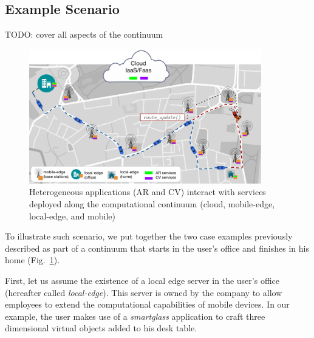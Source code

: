 

\subsection{Example Scenario}

TODO: cover all aspects of the continuum

\begin{figure}[tbp]
	\includegraphics[width=0.9\textwidth]{figs/Continuum-Scenario}
	\caption{Heterogeneous applications (AR and CV) interact with services deployed along the computational continuum (cloud, mobile-edge, local-edge, and mobile)}
	\label{fig:continuum-scenario}
\end{figure}


To illustrate such scenario, we put together the two case examples previously described as part of a continuum that starts in the user's office and finishes in his home (Fig.~\ref{fig:continuum-scenario}). 

First, let us assume the existence of a local edge server in the user's office (hereafter called \textit{local-edge}). This server is owned by the company to allow employees to extend the computational capabilities of mobile devices. In our example, the user makes use of a \textit{smartglass} application to craft three dimensional virtual objects added to his desk table.

